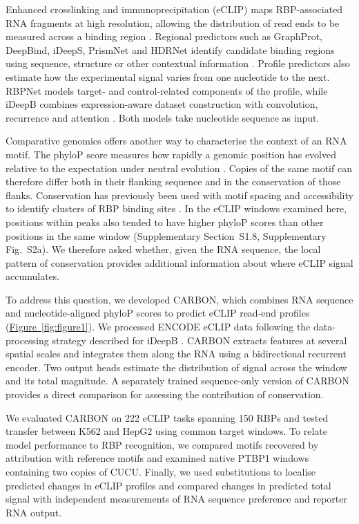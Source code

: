 \documentclass[webpdf,contemporary,large]{current_assets/oup-authoring-template}
\newcommand{\figrefwhole}[1]{\hyperref[#1]{Figure~\ref*{#1}}}
\newcommand{\supfig}[1]{Supplementary Fig.~#1}
\newcommand{\supsect}[1]{Supplementary Section~#1}
\begin{document}
Enhanced crosslinking and immunoprecipitation (eCLIP) maps RBP-associated RNA fragments at high resolution, allowing the distribution of read ends to be measured across a binding region \citep{vannostrand2016eclip,vannostrand2020map,hafner2021clip,ramanathan2019methods}. Regional predictors such as GraphProt, DeepBind, iDeepS, PrismNet and HDRNet identify candidate binding regions using sequence, structure or other contextual information \citep{maticzka2014graphprot,alipanahi2015deepbind,pan2018ideeps,sun2021prismnet,Zhu2023HDRNet}. Profile predictors also estimate how the experimental signal varies from one nucleotide to the next. RBPNet models target- and control-related components of the profile, while iDeepB combines expression-aware dataset construction with convolution, recurrence and attention \citep{horlacher2023rbpnet,liu2025ideepb}. Both models take nucleotide sequence as input.

Comparative genomics offers another way to characterise the context of an RNA motif. The phyloP score measures how rapidly a genomic position has evolved relative to the expectation under neutral evolution \citep{siepel2005phylop,pollard2010phylop,lindbladtoh2011constraint}. Copies of the same motif can therefore differ both in their flanking sequence and in the conservation of those flanks. Conservation has previously been used with motif spacing and accessibility to identify clusters of RBP binding sites \citep{zhang2013mcarts}. In the eCLIP windows examined here, positions within peaks also tended to have higher phyloP scores than other positions in the same window (\supsect{S1.8}, \supfig{S2a}). We therefore asked whether, given the RNA sequence, the local pattern of conservation provides additional information about where eCLIP signal accumulates.

To address this question, we developed CARBON, which combines RNA sequence and nucleotide-aligned phyloP scores to predict eCLIP read-end profiles (\figrefwhole{fig:figure1}). We processed ENCODE eCLIP data following the data-processing strategy described for iDeepB \citep{liu2025ideepb}. CARBON extracts features at several spatial scales and integrates them along the RNA using a bidirectional recurrent encoder. Two output heads estimate the distribution of signal across the window and its total magnitude. A separately trained sequence-only version of CARBON provides a direct comparison for assessing the contribution of conservation.

We evaluated CARBON on 222 eCLIP tasks spanning 150 RBPs and tested transfer between K562 and HepG2 using common target windows. To relate model performance to RBP recognition, we compared motifs recovered by attribution with reference motifs and examined native PTBP1 windows containing two copies of CUCU. Finally, we used substitutions to localise predicted changes in eCLIP profiles and compared changes in predicted total signal with independent measurements of RNA sequence preference and reporter RNA output.
\end{document}
